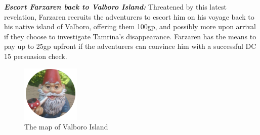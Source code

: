 \begin{multicols*}{2}
	\textbf{\textit{Escort Farzaren back to Valboro Island:}} Threatened by this latest revelation, Farzaren recruits the adventurers to escort him on his voyage back to his native island of Valboro, offering them 100gp, and possibly more upon arrival if they choose to investigate Tamrina’s disappearance. Farzaren has the means to pay up to 25gp upfront if the adventurers can convince him with a successful DC 15 persuasion check.
	
	\begin{figure}
		\includegraphics[width=\textwidth]{images/placeholder}
		\caption{The map of Valboro Island}
	\end{figure}
	
\end{multicols*}